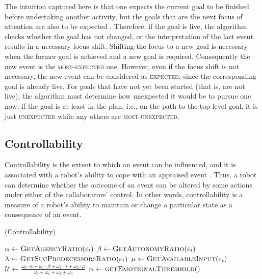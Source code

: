 The intuition captured here is that one expects the current goal to be finished
before undertaking another activity, but the goals that are the next focus of
attention are also to be expected \cite{rich:focused-unfocused-users}.
Therefore, if the goal is live, the algorithm checks whether the goal has not
changed, or the interpretation of the last event results in a necessary focus
shift. Shifting the focus to a new goal is necessary when the former goal is
achieved and a new goal is required. Consequently the new event is the
\textsc{most-expected} one. However, even if the focus shift is not necessary,
the new event can be considered as \textsc{expected}, since the corresponding
goal is already live. For goals that have not yet been started (that is, are not
live), the algorithm must determine how unexpected it would be to pursue one
now; if the goal is at least in the plan, i.e., on the path to the top level
goal, it is just \textsc{unexpected} while any others are
\textsc{most-unexpected}.

\subsection{Controllability}
\label{sec:controllability}

Controllability is the extent to which an event can be influenced, and it is
associated with a robot's ability to cope with an appraised event
\cite{gratch:domain-independent}. Thus, a robot can determine whether the
outcome of an event can be altered by some actions under either of the
collaborators' control. In other words, controllability is a measure of a
robot's ability to maintain or change a particular state as a consequence of an
event.

\begin{algorithm}
	\caption{(Controllability)}
	\label{alg:controllability}
	\begin{algorithmic}[1]
			\Statex
			\State $\alpha \gets \Call{GetAgencyRatio}{\varepsilon_t}$ 
			\State $\beta \gets \Call{GetAutonomyRatio}{\varepsilon_t}$
			\Statex
			\State $\lambda \gets \Call{GetSucPredecessorsRatio}{\varepsilon_t}$
			\State $\mu \gets \Call{GetAvailableInput}{\varepsilon_t}$
			\Statex
			\State $\mathcal{U} \gets
			\frac{\omega_{0}\cdot \alpha + \omega_{1}\cdot \beta + \omega_{2}\cdot
			\lambda + \omega_{3}\cdot \mu}{\omega_{0} + \omega_{1} + \omega_{2} +
			\omega_{3}}$
			\Statex
			\State $\tau_{t} \gets \Call{getEmotionalThreshold}{ }$
			\Statex
				\State {}
			\Else
				\State {}
			\EndIf
		\EndFunction
	\end{algorithmic}
\end{algorithm}

